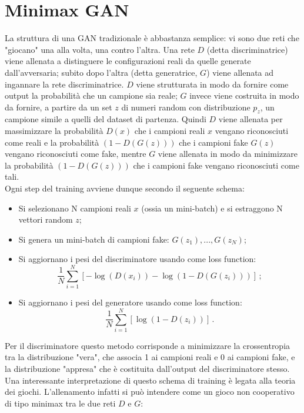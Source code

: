 \documentclass[Lau, noexaminfo, oneside]{sapthesis} %
\begin{document}
\section{Minimax GAN}
La struttura di una GAN tradizionale è abbastanza semplice: vi sono due reti che "giocano" una alla volta, una contro l'altra. Una rete $D$ (detta discriminatrice) viene allenata a distinguere le configurazioni reali da quelle generate dall'avversaria; subito dopo l'altra (detta generatrice, $G$) viene allenata ad ingannare la rete discriminatrice. $D$ viene strutturata in modo da fornire come output la probabilità che un campione sia reale; $G$ invece viene costruita in modo da fornire, a partire da un set $z$ di numeri random con distribuzione $p_z$, un campione simile a quelli del dataset di partenza. Quindi $D$ viene allenata per massimizzare la probabilità $D(x)$ che i campioni reali $x$ vengano riconosciuti come reali e la probabilità $(1-D(G(z)))$ che i campioni fake $G(z)$ vengano riconosciuti come fake, mentre $G$ viene allenata in modo da minimizzare la probabilità $(1-D(G(z)))$ che i campioni fake vengano riconosciuti come tali.\\
Ogni step del training avviene dunque secondo il seguente schema:
\begin{itemize}
\item Si selezionano N campioni reali $x$ (ossia un mini-batch) e si estraggono N vettori random $z$;
\item Si genera un mini-batch di campioni fake: $G(z_1), ..., G(z_N)$;
\item Si aggiornano i pesi del discriminatore usando come loss function: 
\begin{equation}
\frac{1}{N}\sum_{i=1}^{N} [-\log(D(x_i)) - \log(1-D(G(z_i)))] \,;
\end{equation}
\item Si aggiornano i pesi del generatore usando come loss function: 
\begin{equation}
\frac{1}{N}\sum_{i=1}^{N} [\log(1-D(z_i))] \,.
\end{equation}
\end{itemize}
Per il discriminatore questo metodo corrisponde a minimizzare la crossentropia tra la distribuzione "vera", che associa 1 ai campioni reali e 0 ai campioni fake, e la distribuzione "appresa" che è costituita dall'output del discriminatore stesso. \\
Una interessante interpretazione di questo schema di training è legata alla teoria dei giochi. L'allenamento infatti si può intendere come un gioco non cooperativo di tipo minimax tra le due reti $D$ e $G$:
\end{document}
